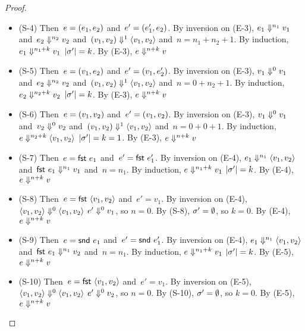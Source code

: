 \documentclass{article}
\begin{document}
\begin{proof}
\begin{itemize}
    \item (S-4) Then~$e = \kwpair{e_1}{e_2}$
        and~$e' = \kwpair{e_1'}{e_2}$.
        By inversion on (E-3),
        $\eval[n_1]{e_1}{v_1}$
        and~$\eval[n_2]{e_2}{v_2}$
        and~$\eval[1]{\kwpair{v_1}{v_2}}{\kwvpair{v_1}{v_2}}$
        and~$n = n_1 + n_2 + 1$.
        By induction,
        $\eval[n_1 + k]{e_1}{v_1}$
        $|\store'| = k$.
        By (E-3),
        $\eval[n+k]{e}{v}$
    \item (S-5) Then~$e = \kwpair{v_1}{e_2}$
        and~$e' = \kwpair{v_1}{e_2'}$.
        By inversion on (E-3),
        $\eval[0]{v_1}{v_1}$
        and~$\eval[n_2]{e_2}{v_2}$
        and~$\eval[1]{\kwpair{v_1}{v_2}}{\kwvpair{v_1}{v_2}}$
        and~$n = 0 + n_2 + 1$.
        By induction,
        $\eval[n_2 + k]{e_2}{v_2}$
        $|\store'| = k$.
        By (E-3),
        $\eval[n+k]{e}{v}$
    \item (S-6) Then~$e = \kwpair{v_1}{v_2}$
        and~$e' = \kwpair{v_1}{v_2}$.
        By inversion on (E-3),
        $\eval[0]{v_1}{v_1}$
        and~$\eval[0]{v_2}{v_2}$
        and~$\eval[1]{\kwpair{v_1}{v_2}}{\kwvpair{v_1}{v_2}}$
        and~$n = 0 + 0 + 1$.
        By induction,
        $\eval[n_2 + k]{e}{\kwvpair{v_1}{v_2}}$
        $|\store'| = k = 1$.
        By (E-3),
        $\eval[n+k]{e}{v}$
        
    \item (S-7) Then~$e = \kwfst{e_1}$ and~$e' = \kwfst{e_1'}$.
        By inversion on (E-4),
        $\eval[n_1]{e_1}{\kwvpair{v_1}{v_2}}$
        and~$\eval[n_1]{\kwfst{e_1}}{v_1}$
        and~$n = n_1$.
        By induction,
        $\eval[n_1 + k]{e}{v_1}$
        $|\store'| = k$.
        By (E-4),
        $\eval[n+k]{e}{v}$
    
    \item (S-8) Then~$e = \kwfst{\kwvpair{v_1}{v_2}}$ and~$e' = v_1$.
        By inversion on (E-4),
        $\eval[0]{\kwvpair{v_1}{v_2}}{\kwvpair{v_1}{v_2}}$
        $\eval[0]{e'}{v_1}$, so $n = 0$.
        By (S-8), $\store' = \estore$, so $k = 0$.
        By (E-4),
        $\eval[n+k]{e}{v}$
    
    \item (S-9) Then~$e = \kwsnd{e_1}$ and~$e' = \kwsnd{e_1'}$.
        By inversion on (E-4),
        $\eval[n_1]{e_1}{\kwvpair{v_1}{v_2}}$
        and~$\eval[n_1]{\kwfst{e_1}}{v_2}$
        and~$n = n_1$.
        By induction,
        $\eval[n_1 + k]{e}{v_1}$
        $|\store'| = k$.
        By (E-5),
        $\eval[n+k]{e}{v}$
    
    \item (S-10) Then~$e = \kwfst{\kwvpair{v_1}{v_2}}$ and~$e' = v_1$.
        By inversion on (E-5),
        $\eval[0]{\kwvpair{v_1}{v_2}}{\kwvpair{v_1}{v_2}}$
        $\eval[0]{e'}{v_2}$, so $n = 0$.
        By (S-10), $\store' = \estore$, so $k = 0$.
        By (E-5),
        $\eval[n+k]{e}{v}$
    
    \end{itemize}
  \end{proof}
\end{document}
